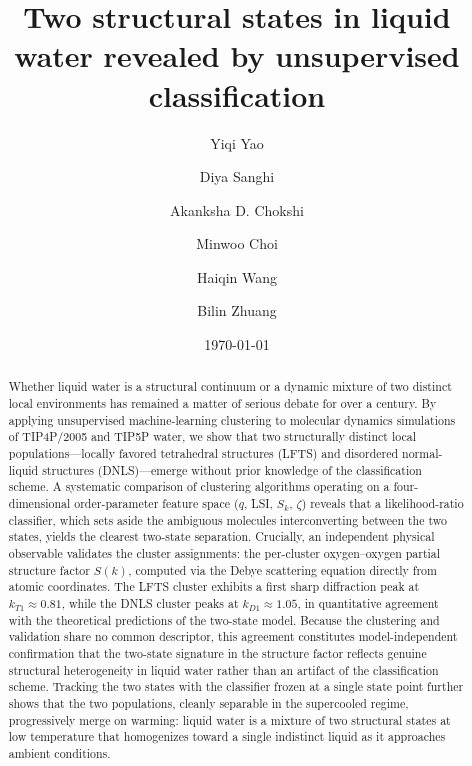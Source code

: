 \documentclass[aps, amsmath,amssymb, reprint, twocolumn, superscriptaddress]{revtex4-2}
\begin{document}
\title{Two structural states in liquid water revealed by unsupervised classification}
\author{Yiqi Yao}
\author{Diya Sanghi}
\author{Akanksha D. Chokshi}
\author{Minwoo Choi}
\author{Haiqin Wang}
\author{Bilin Zhuang}
\date{\today}

\begin{abstract}
Whether liquid water is a structural continuum or a dynamic mixture of two distinct local environments
has remained a matter of serious debate for over a century. By applying unsupervised machine-learning
clustering to molecular dynamics simulations of TIP4P/2005 and TIP5P water, we show that two
structurally distinct local populations---locally favored tetrahedral structures (LFTS) and disordered
normal-liquid structures (DNLS)---emerge without prior knowledge of the classification scheme.
A systematic comparison of clustering algorithms operating on a four-dimensional order-parameter feature
space ($q$, LSI, $S_k$, $\zeta$) reveals that a likelihood-ratio classifier, which sets aside the
ambiguous molecules interconverting between the two states, yields the clearest
two-state separation. Crucially, an independent physical observable validates the cluster assignments: the per-cluster oxygen--oxygen partial structure factor $S(k)$, computed via the Debye
scattering equation directly from atomic coordinates. The LFTS cluster exhibits a first sharp diffraction
peak at $k_{T1}\approx 0.81$, while the DNLS cluster peaks at $k_{D1} \approx 1.05$, in quantitative
agreement with the theoretical predictions of the two-state model. Because the clustering and validation
share no common descriptor, this agreement constitutes model-independent confirmation that the two-state
signature in the structure factor reflects genuine structural heterogeneity in liquid water rather than an
artifact of the classification scheme. Tracking the two states with the classifier frozen at a single
state point further shows that the two populations, cleanly separable in the supercooled regime,
progressively merge on warming: liquid water is a mixture of two structural states at low temperature
that homogenizes toward a single indistinct liquid as it approaches ambient conditions.
\end{abstract}
\end{document}
